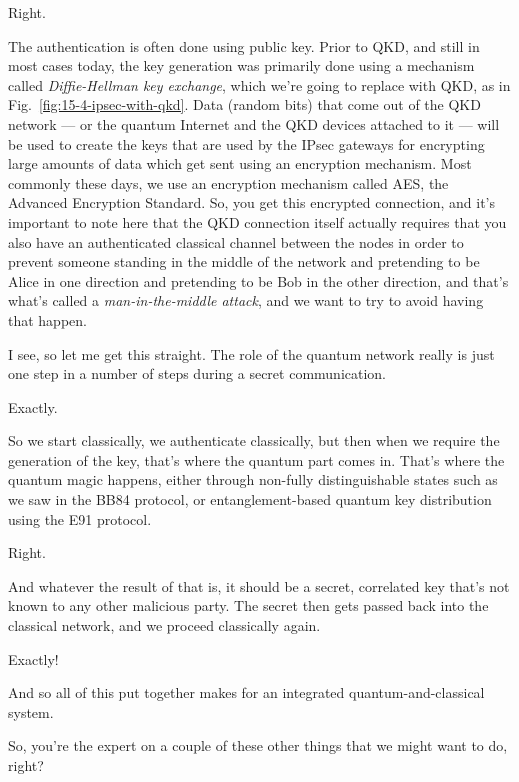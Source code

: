 \mmm Right.

\rrr The authentication is often done using public key. Prior to QKD, and still in most cases today, the key generation was primarily done using a mechanism called \emph{Diffie-Hellman key exchange}, which we're going to replace with QKD, as in Fig.~\ref{fig:15-4-ipsec-with-qkd}. Data (random bits) that come out of the QKD network --- or the quantum Internet and the QKD devices attached to it --- will be used to create the keys that are used by the IPsec gateways for encrypting large amounts of data which get sent using an encryption mechanism. Most commonly these days, we use an encryption mechanism called AES, the Advanced Encryption Standard. So, you get this encrypted connection, and it's important to note here that the QKD connection itself actually requires that you also have an authenticated classical channel between the nodes in order to prevent someone standing in the middle of the network and pretending to be Alice in one direction and pretending to be Bob in the other direction, and that's what's called a \emph{man-in-the-middle attack}, and we want to try to avoid having that happen.

\mmm I see, so let me get this straight. The role of the quantum network really is just one step in a number of steps during a secret communication.

\rrr Exactly.

\mmm So we start classically, we authenticate classically, but then when we require the generation of the key, that's where the quantum part comes in. That's where the quantum magic happens, either through non-fully distinguishable states such as we saw in the BB84 protocol, or entanglement-based quantum key distribution using the E91 protocol.

\rrr Right.

\mmm And whatever the result of that is, it should be a secret, correlated key that's not known to any other malicious party.  The secret then gets passed back into the classical network, and we proceed classically again.

\rrr Exactly!

And so all of this put together makes for an integrated quantum-and-classical system.

So, you're the expert on a couple of these other things that we might want to do, right?


